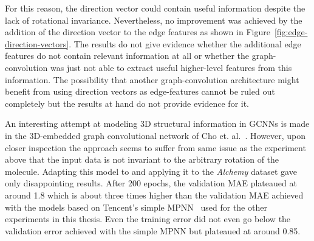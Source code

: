 For this reason, the direction vector could contain useful information despite the lack of rotational invariance. Nevertheless, no improvement was achieved by the addition of the direction vector to the edge features as shown in Figure~\ref{fig:edge-direction-vectors}. The results do not give evidence whether the additional edge features do not contain relevant information at all or whether the graph-convolution was just not able to extract useful higher-level features from this information. The possibility that another graph-convolution architecture might benefit from using direction vectors as edge-features cannot be ruled out completely but the results at hand do not provide evidence for it.

An interesting attempt at modeling 3D structural information in GCNNs is made in the 3D-embedded graph convolutional network of Cho et. al.~\cite{Cho2018}. However, upon closer inspection the approach seems to suffer from same issue as the experiment above that the input data is not invariant to the arbitrary rotation of the molecule. Adapting this model to and applying it to the \textit{Alchemy} dataset gave only disappointing results. After 200 epochs, the validation MAE plateaued at around 1.8 which is about three times higher than the validation MAE achieved with the models based on Tencent's simple MPNN~\cite{Chen2019} used for the other experiments in this thesis. Even the training error did not even go below the validation error achieved with the simple MPNN but plateaued at around 0.85.






